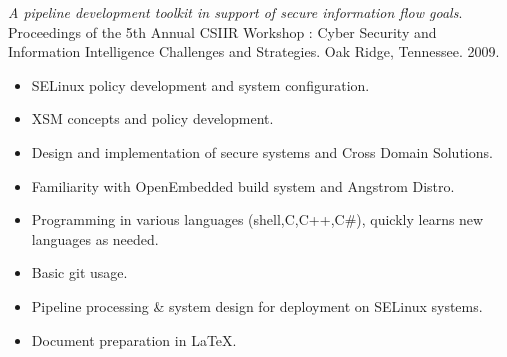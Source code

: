 \documentclass[letterpaper,11pt]{article}
\begin{document}
    {\it A pipeline development toolkit in support of secure information flow goals}.
    Proceedings of the 5th Annual CSIIR Workshop : Cyber Security and Information Intelligence Challenges and Strategies.
    Oak Ridge, Tennessee.
    2009.
    \begin {itemize}
      \setlength {\itemsep}{1pt}
      \setlength {\parskip}{0pt}
      \setlength {\parsep}{0pt}
      \item SELinux policy development and system configuration.
      \item XSM concepts and policy development.
      \item Design and implementation of secure systems and Cross Domain Solutions.
      \item Familiarity with OpenEmbedded build system and Angstrom Distro.
      \item Programming in various languages (shell,C,C++,C\#), quickly learns new languages as needed.
      \item Basic git usage.
      \item Pipeline processing \& system design for deployment on SELinux systems.
      \item Document preparation in \LaTeX.
    \end {itemize}
\end{document}
